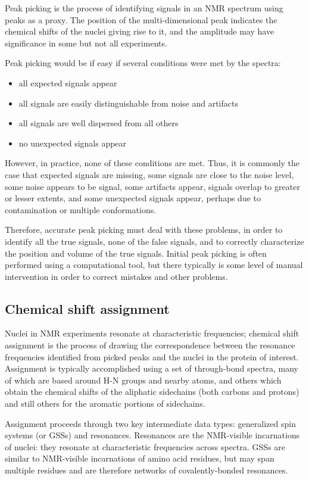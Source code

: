 Peak picking is the process of identifying signals in an NMR spectrum using
peaks as a proxy.  The position of the multi-dimensional peak indicates the
chemical shifts of the nuclei giving rise to it, and the amplitude may have
significance in some but not all experiments.

Peak picking would be if easy if several conditions were met by the spectra:

\begin{itemize}
  \item all expected signals appear
  \item all signals are easily distinguishable from noise and artifacts
  \item all signals are well dispersed from all others
  \item no unexpected signals appear
\end{itemize}
 
However, in practice, none of these conditions are met.  Thus, it is commonly
the case that expected signals are missing, some signals are close to the noise
level, some noise appears to be signal, some artifacts appear, signals overlap
to greater or lesser extents, and some unexpected signals appear, perhaps due
to contamination or multiple conformations.

Therefore, accurate peak picking must deal with these problems, in order to
identify all the true signals, none of the false signals, and to correctly 
characterize the position and volume of the true signals.  Initial peak picking
is often performed using a computational tool, but there typically is some
level of manual intervention in order to correct mistakes and other problems.

\subsection*{Chemical shift assignment}

Nuclei in NMR experiments resonate at characteristic frequencies; 
chemical shift assignment is the process of drawing the correspondence between
the resonance frequencies identified from picked peaks and the nuclei in the
protein of interest.  Assignment is typically accomplished using a set of
through-bond spectra, many of which are based around H-N groups and nearby
atoms, and others which obtain the chemical shifts of the aliphatic sidechains
(both carbons and protons) and still others for the aromatic portions of
sidechains.

Assignment proceeds through two key intermediate data types: generalized spin
systems (or GSSs) and resonances.  Resonances are the NMR-visible incarnations
of nuclei: they resonate at characteristic frequencies across spectra.  GSSs
are similar to NMR-visible incarnations of amino acid residues, but may span
multiple residues and are therefore networks of covalently-bonded resonances.


